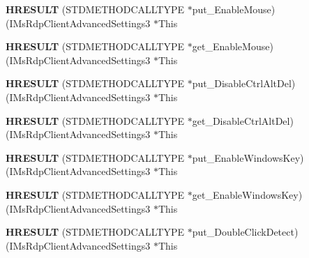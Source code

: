 \begin{DoxyCompactItemize}
{\bfseries H\+R\+E\+S\+U\+LT} (S\+T\+D\+M\+E\+T\+H\+O\+D\+C\+A\+L\+L\+T\+Y\+PE $\ast$put\+\_\+\+Enable\+Mouse)(I\+Ms\+Rdp\+Client\+Advanced\+Settings3 $\ast$This
\item 
\mbox{\label{struct_i_ms_rdp_client_advanced_settings3_vtbl_aac3562d4b808014c2419c41a13f5f0e8}} 
{\bfseries H\+R\+E\+S\+U\+LT} (S\+T\+D\+M\+E\+T\+H\+O\+D\+C\+A\+L\+L\+T\+Y\+PE $\ast$get\+\_\+\+Enable\+Mouse)(I\+Ms\+Rdp\+Client\+Advanced\+Settings3 $\ast$This
\item 
\mbox{\label{struct_i_ms_rdp_client_advanced_settings3_vtbl_afb2ba47be2ba24b17eeaf02efeca7523}} 
{\bfseries H\+R\+E\+S\+U\+LT} (S\+T\+D\+M\+E\+T\+H\+O\+D\+C\+A\+L\+L\+T\+Y\+PE $\ast$put\+\_\+\+Disable\+Ctrl\+Alt\+Del)(I\+Ms\+Rdp\+Client\+Advanced\+Settings3 $\ast$This
\item 
\mbox{\label{struct_i_ms_rdp_client_advanced_settings3_vtbl_a402de980413fdf52eec4269b80c47fe1}} 
{\bfseries H\+R\+E\+S\+U\+LT} (S\+T\+D\+M\+E\+T\+H\+O\+D\+C\+A\+L\+L\+T\+Y\+PE $\ast$get\+\_\+\+Disable\+Ctrl\+Alt\+Del)(I\+Ms\+Rdp\+Client\+Advanced\+Settings3 $\ast$This
\item 
\mbox{\label{struct_i_ms_rdp_client_advanced_settings3_vtbl_a5a0b30617f3392e843feede888a0568b}} 
{\bfseries H\+R\+E\+S\+U\+LT} (S\+T\+D\+M\+E\+T\+H\+O\+D\+C\+A\+L\+L\+T\+Y\+PE $\ast$put\+\_\+\+Enable\+Windows\+Key)(I\+Ms\+Rdp\+Client\+Advanced\+Settings3 $\ast$This
\item 
\mbox{\label{struct_i_ms_rdp_client_advanced_settings3_vtbl_a832b32df3284c167f5b3317f787262eb}} 
{\bfseries H\+R\+E\+S\+U\+LT} (S\+T\+D\+M\+E\+T\+H\+O\+D\+C\+A\+L\+L\+T\+Y\+PE $\ast$get\+\_\+\+Enable\+Windows\+Key)(I\+Ms\+Rdp\+Client\+Advanced\+Settings3 $\ast$This
\item 
\mbox{\label{struct_i_ms_rdp_client_advanced_settings3_vtbl_a6f985f69b5bfee73221d649e0c064a8c}} 
{\bfseries H\+R\+E\+S\+U\+LT} (S\+T\+D\+M\+E\+T\+H\+O\+D\+C\+A\+L\+L\+T\+Y\+PE $\ast$put\+\_\+\+Double\+Click\+Detect)(I\+Ms\+Rdp\+Client\+Advanced\+Settings3 $\ast$This

\end{DoxyCompactItemize}
